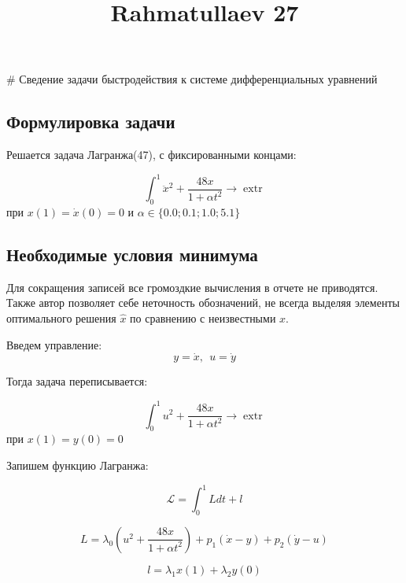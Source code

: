 \documentclass[11pt]{article}
\title{Rahmatullaev 27}
\begin{document}
    
    \maketitle
    
    

    
    \# Сведение задачи быстродействия к системе дифференциальных уравнений

    \hypertarget{ux444ux43eux440ux43cux443ux43bux438ux440ux43eux432ux43aux430-ux437ux430ux434ux430ux447ux438}{%
\subsection{Формулировка
задачи}\label{ux444ux43eux440ux43cux443ux43bux438ux440ux43eux432ux43aux430-ux437ux430ux434ux430ux447ux438}}

    Решается задача Лагранжа(47), с фиксированными концами:

\[\int_0^1 \ddot{x}^2 + \frac{48x}{1+ \alpha t^2} \rightarrow \operatorname{extr}\]
при \(x(1) = \dot{x}(0) = 0\) и \(\alpha \in \{ 0.0; 0.1; 1.0; 5.1\}\)

    \hypertarget{ux43dux435ux43eux431ux445ux43eux434ux438ux43cux44bux435-ux443ux441ux43bux43eux432ux438ux44f-ux43cux438ux43dux438ux43cux443ux43cux430}{%
\subsection{Необходимые условия
минимума}\label{ux43dux435ux43eux431ux445ux43eux434ux438ux43cux44bux435-ux443ux441ux43bux43eux432ux438ux44f-ux43cux438ux43dux438ux43cux443ux43cux430}}

    Для сокращения записей все громоздкие вычисления в отчете не приводятся.
Также автор позволяет себе неточность обозначений, не всегда выделяя
элементы оптимального решения \(\hat{x}\) по сравнению с неизвестными
\(x\).

Введем управление: \[y = \dot{x}, \ \ u = \dot{y}\]

Тогда задача переписывается:

\[\int_0^1 u^2 + \frac{48x}{1+ \alpha t^2} \rightarrow \operatorname{extr}\]
при \(x(1) = y(0) = 0\)

Запишем функцию Лагранжа:

\[ \mathcal{L} = \int_{0}^{1} L dt + l \]

\[L = \lambda_{0} \left( u^2 + \frac{48x}{1+ \alpha t^2} \right) + p_1 (\dot{x} - y) + p_2 (\dot{y} - u)\]

\[l = \lambda_1 x(1) + \lambda_2 y(0)\]
\end{document}
